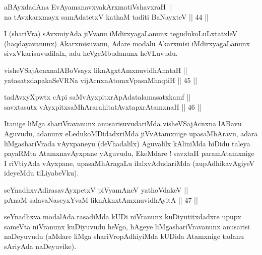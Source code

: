 \begin{shl}
aBAyxdadAna EvAyamanavxvakArxmatiVshavxraH || \\
na tAvxkarxmayx samAdatetxV kathaM taditi BaNayxteV \hfill || 44 ||  
\end{shl}

\begin{artha}
I (shariVra) sAvxmiyAda jiVvanu iMdirxyagaLanunx tegudukoLuLxtatxleV
(haqdayavanunx) Akarxmisuvanu, Adare modalu Akarxmisi iMdirxyagaLanunx
sivxVkarisuvudilalx, adu heVgeMbudanunx heVLuvudu.
\end{artha}


\begin{shl}
visheVSajAcnxnalABoV\s sayx liknAgxtAmxnuvidhAnataH || \\
yatasatxdapakaSeVRNa vijAcnxnAtomxVpasaMhaqtiH \hfill || 45 ||  
\end{shl}

\begin{shl}
tadAvxyXpwtx cApi saMvAyxpitxrApAdatalamasatxkamf || \\
savxtasutx vAyxpitxsaMhArarahitatAvxtapxrAtamxnaH \hfill || 46 ||  
\end{shl}

\begin{artha}
Itanige liMga shariVravanunx anusarisuvudariMda visheVSajAcnxna lABavu
Aguvudu, adanunx eLedukoMDidadxriMda jiVvAtamxnige upasaMhAravu, adara
liMgashariVrada vAyxpaneyu (deVhadalilx) Aguvalilx kAliniMda hiDidu
taleya payaRMta AtamxnavAyxpane yAguvudu, EkeMdare ! savxtaH
paramAtamxnige I riVtiyAda vAyxpane, upasaMhAragaLu ilalxvAdudariMda
(aupAdhikavAgiyeV ideyeMdu tiLiyabeVku).
\end{artha}


\begin{shl}
seYnadhxvAdirasavAyxpetxV piVyamAneV yathoVdakeV || \\
pAnaM salavaNaseyxYvaM liknAknxtAmxnuvidhAyitA \hfill || 47 ||  
\end{shl}

\begin{artha}
seYnadhxva modalAda rasadiMda kUDi niVranunx kuDiyutitxdadxre upupx
sameVta niVranunx kuDiyuvudu heVgo, hAgeye liMgashariVravanunx
anusarisi naDeyuvudu (aMdare liMga shariVropAdhiyiMda kUDida Atamxnige
tadanu sAriyAda naDeyuvike).
\end{artha}

